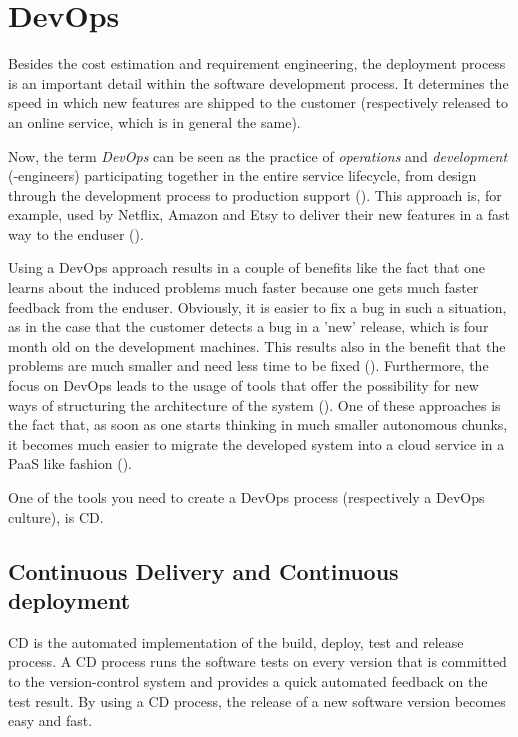 \section{DevOps}
Besides the cost estimation and requirement engineering, the deployment process is an important detail within the software development process. It determines the speed in which new features are shipped to the customer (respectively released to an online service, which is in general the same).

Now, the term \emph{DevOps} can be seen as the practice of \emph{operations} and \emph{development} (-engineers) participating together in the entire service lifecycle, from design through the development process to production support (\cite{Mueller2011}). This approach is, for example, used by Netflix, Amazon and Etsy to deliver their new features in a fast way to the enduser (\cite{duvall2012breaking}).

Using a DevOps approach results in a couple of benefits like the fact that one learns about the induced problems much faster because one gets much faster feedback from the enduser. Obviously, it is easier to fix a bug in such a situation, as in the case that the customer detects a bug in a 'new' release, which is four month old on the development machines. This results also in the benefit that the problems are much smaller and need less time to be fixed (\cite{duvall2012breaking}).
Furthermore, the focus on DevOps leads to the usage of tools that offer the possibility for new ways of structuring the architecture of the system (\cite{cukier2013devops}). One of these approaches is the fact that, as soon as one starts thinking in much smaller autonomous chunks, it becomes much easier to migrate the developed system into a cloud service in a \ac{PaaS} like fashion (\cite{cukier2013devops}). 

One of the tools you need to create a DevOps process (respectively a DevOps culture), is \acl{CD}.

\subsection{Continuous Delivery and Continuous deployment}
\acf{CD} is the automated implementation of the build, deploy, test and release process. A \ac{CD} process runs the software tests on every version that is committed to the version-control system and provides a quick automated feedback on the test result. By using a \ac{CD} process, the release of a new software version becomes easy and fast. 

